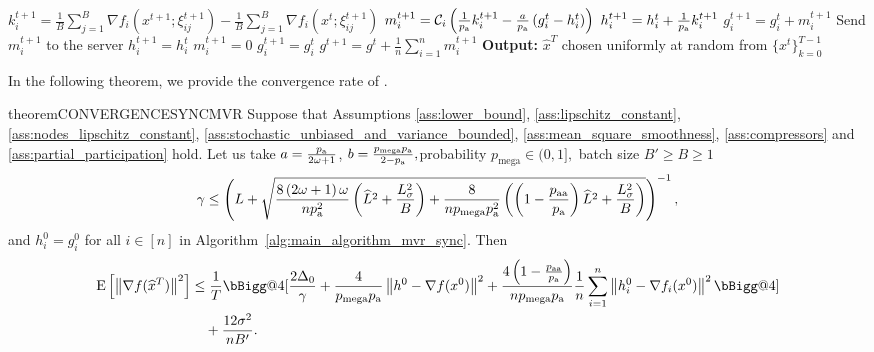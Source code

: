 \documentclass{article}
\makeatletter
\newcommand{\algorithmname}{DARIA}
\newcommand*{\probavailable}{\ensuremath{p_{\textnormal{a}}}}
\newcommand*{\probpairaa}{\ensuremath{p_{\textnormal{aa}}}}
\newcommand*{\probmega}{\ensuremath{p_{\text{mega}}}}
\newcommand{\vast}{\bBigg@{4}}
\makeatother
\begin{document}
\begin{algorithm}[h]
\begin{algorithmic}[1]
              \STATE $k^{t+1}_i = \frac{1}{B} \sum_{j=1}^{B}\nabla f_i(x^{t+1};\xi^{t+1}_{ij}) - \frac{1}{B} \sum_{j=1}^{B}\nabla f_i(x^{t};\xi^{t+1}_{ij})$
              \STATE $m^{t+1}_i = \cC_i\left(\frac{1}{\probavailable}k^{t+1}_i - \frac{a}{\probavailable} \left(g^t_i - h^{t}_i\right)\right)$ 
          \ENDIF
          \STATE $h^{t+1}_i = h^t_i + \frac{1}{\probavailable}k^{t+1}_i$ 
          \STATE $g^{t+1}_i = g^t_i + m^{t+1}_i$
          \STATE Send $m^{t+1}_i$ to the server
      \ELSE
          \STATE $h^{t+1}_i = h^{t}_i$
          \STATE $m^{t+1}_i = 0$
          \STATE $g^{t+1}_i = g^{t}_i$
      \ENDIF
      \ENDFOR
      \STATE $g^{t+1} = g^t + \frac{1}{n} \sum_{i=1}^{n} m^{t+1}_i$
      \ENDFOR
      \STATE \textbf{Output:} $\hat{x}^T$ chosen uniformly at random from $\{x^t\}_{k=0}^{T-1}$
      \end{algorithmic}
  \end{algorithm}

  In the following theorem, we provide the convergence rate of \algname{\algorithmname-SYNC-MVR}.

  \begin{restatable}{theorem}{CONVERGENCESYNCMVR}
    \label{theorem:sync_stochastic}
    Suppose that Assumptions \ref{ass:lower_bound}, \ref{ass:lipschitz_constant}, \ref{ass:nodes_lipschitz_constant}, \ref{ass:stochastic_unbiased_and_variance_bounded}, \ref{ass:mean_square_smoothness}, \ref{ass:compressors} and \ref{ass:partial_participation} hold. Let us take $a = \frac{\probavailable}{2\omega + 1}$, $b = \frac{\probmega \probavailable}{2 - \probavailable},$probability $\probmega \in (0, 1],$ batch size $B' \geq B \geq 1$ $$\gamma \leq \left(L + \sqrt{\frac{8 \left(2\omega + 1\right) \omega}{n \probavailable^2}\left(\widehat{L}^2 + \frac{L_{\sigma}^2}{B}\right) + \frac{8}{n \probmega \probavailable^2} \left(\left(1 - \frac{\probpairaa}{\probavailable}\right) \widehat{L}^2 + \frac{L_{\sigma}^2}{B}\right)}\right)^{-1},$$ and $h^{0}_i = g^{0}_i$ for all $i \in [n]$
    in Algorithm~\ref{alg:main_algorithm_mvr_sync}. Then 
    \begin{align*}
      \Exp{\norm{\nabla f(\widehat{x}^T)}^2} &\leq \frac{1}{T}\vast[\frac{2 \Delta_0}{\gamma} + \frac{4}{\probmega \probavailable} \norm{h^{0} - \nabla f(x^{0})}^2 + \frac{4 \left(1 - \frac{\probpairaa}{\probavailable}\right)}{n \probmega \probavailable}\frac{1}{n}\sum_{i=1}^n\norm{h^{0}_i - \nabla f_i(x^{0})}^2 \vast] \\
      &\quad + \frac{12 \sigma^2}{n B'}.
    \end{align*}
  \end{restatable}
\end{document}
